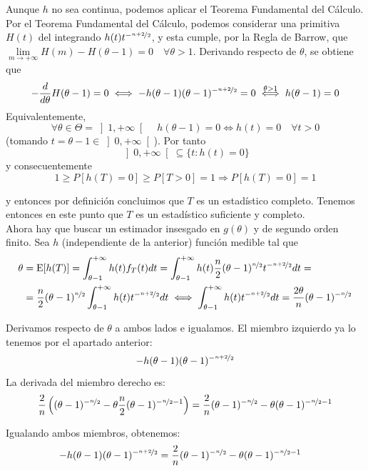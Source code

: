 \documentclass[12pt]{article}
\newcommand{\E}{\mathrm{E}}
\begin{document}
\begin{ejercicio}[2.5 puntos]
\begin{enumerate}[label=\alph*)]
            Aunque $h$ no sea continua, podemos aplicar el Teorema Fundamental del Cálculo.
            Por el Teorema Fundamental del Cálculo, podemos considerar una primitiva $H(t)$ del integrando $h(t) t^{-\nicefrac{n+2}{2}}$, y esta cumple,
            por la Regla de Barrow, que $\lim\limits_{m \to +\infty} H(m) - H(\theta-1) = 0 \quad \forall \theta > 1$. Derivando respecto 
            de $\theta$, se obtiene que
            $$-\dfrac{d}{d \theta} H(\theta-1) = 0 \iff -h(\theta-1) (\theta-1)^{-\nicefrac{n+2}{2}} = 0 \stackrel{\theta > 1}{\iff} h(\theta-1) = 0$$
            Equivalentemente,
            $$\forall \theta \in \Theta = \left] 1, + \infty \right[ \quad h(\theta-1) = 0 \iff h(t) = 0 \quad \forall t > 0$$ (tomando $t = \theta-1 \in \left]0, +\infty \right[$).
            Por tanto $$\left]0, +\infty \right[ \subseteq \{t : h(t) = 0\}$$ y consecuentemente $$1 \geqslant P[h(T) = 0] \geqslant P[T > 0] = 1
            \Longrightarrow P[h(T) = 0] = 1$$

            y entonces por definición concluimos que $T$ es un estadístico completo. Tenemos entonces en este punto
            que $T$ es un estadístico suficiente y completo.\\

            Ahora hay que buscar un estimador insesgado en $g(\theta)$ y de segundo orden finito. Sea $h$ (independiente de la anterior) función medible tal que
            \begin{align*}
                \theta &= \E[h(T)] = \int_{\theta-1}^{+\infty} h(t) f_T(t) dt = \int_{\theta-1}^{+\infty} h(t) \dfrac{n}{2} (\theta-1)^{\nicefrac{n}{2}} t^{-\nicefrac{n+2}{2}} dt =\\&= \frac{n}{2} (\theta-1)^{\nicefrac{n}{2}} \int_{\theta-1}^{+\infty} h(t) t^{-\nicefrac{n+2}{2}} dt\iff \int_{\theta-1}^{+\infty} h(t) t^{-\nicefrac{n+2}{2}} dt = \dfrac{2 \theta}{n} (\theta-1)^{-\nicefrac{n}{2}}
            \end{align*}
            
            Derivamos respecto de $\theta$ a ambos lados e igualamos. El miembro izquierdo ya lo tenemos por el apartado anterior:
            $$-h(\theta-1) (\theta-1)^{-\nicefrac{n+2}{2}}$$
            La derivada del miembro derecho es:
            $$\dfrac{2}{n}\left( (\theta-1)^{-\nicefrac{n}{2}} - \theta \dfrac{n}{2} (\theta-1)^{-\nicefrac{n}{2}-1} \right) = \dfrac{2}{n}(\theta-1)^{-\nicefrac{n}{2}} - \theta (\theta-1)^{-\nicefrac{n}{2}-1}$$

            Igualando ambos miembros, obtenemos:
            \begin{align*}
                -h(\theta-1) (\theta-1)^{-\nicefrac{n+2}{2}} &= \dfrac{2}{n}(\theta-1)^{-\nicefrac{n}{2}} - \theta (\theta-1)^{-\nicefrac{n}{2}-1}
            \end{align*}


\end{enumerate}
\end{ejercicio}
\end{document}
